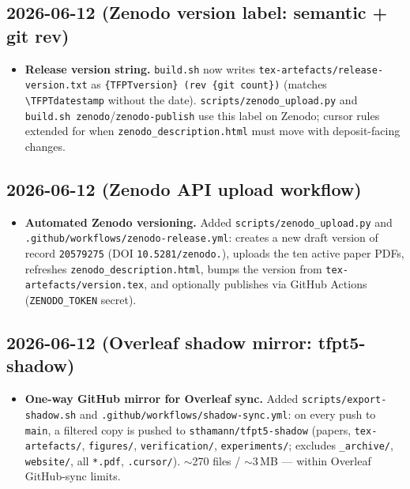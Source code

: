 \subsection*{2026-06-12 (Zenodo version label: semantic + git rev)}
\begin{itemize}
\item \textbf{Release version string.} \texttt{build.sh} now writes
  \texttt{tex-artefacts/release-version.txt} as \texttt{\{TFPTversion\} (rev \{git count\})}
  (matches \texttt{\textbackslash TFPTdatestamp} without the date). \texttt{scripts/zenodo\_upload.py}
  and \texttt{build.sh zenodo}/\texttt{zenodo-publish} use this label on Zenodo; cursor rules extended
  for when \texttt{zenodo\_description.html} must move with deposit-facing changes.
\end{itemize}

\subsection*{2026-06-12 (Zenodo API upload workflow)}
\begin{itemize}
\item \textbf{Automated Zenodo versioning.} Added \texttt{scripts/zenodo\_upload.py} and
  \texttt{.github/workflows/\allowbreak zenodo-release.yml}: creates a new draft version of record
  \texttt{20579275} (DOI \texttt{10.5281/\allowbreak zenodo.}), uploads the ten active paper PDFs,
  refreshes \texttt{zenodo\_description.html}, bumps the version from \texttt{tex-artefacts/version.tex},
  and optionally publishes via GitHub Actions (\texttt{ZENODO\_TOKEN} secret).
\end{itemize}

\subsection*{2026-06-12 (Overleaf shadow mirror: tfpt5-shadow)}
\begin{itemize}
\item \textbf{One-way GitHub mirror for Overleaf sync.} Added \texttt{scripts/export-shadow.sh} and
  \texttt{.github/workflows/shadow-sync.yml}: on every push to \texttt{main}, a filtered copy is pushed to
  \texttt{sthamann/tfpt5-shadow} (papers, \texttt{tex-artefacts/}, \texttt{figures/},
  \texttt{verification/}, \texttt{experiments/}; excludes \texttt{\_archive/}, \texttt{website/}, all
  \texttt{*.pdf}, \texttt{.cursor/}). $\sim$270 files / $\sim$3\,MB --- within Overleaf GitHub-sync limits.
\end{itemize}

